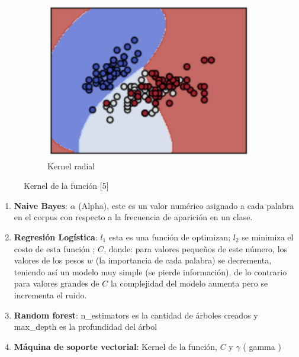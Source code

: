 \begin{enumerate}
\begin{itemize}
\begin{figure}[h]
        \begin{subfigure}{.25\textwidth}
        \centering
        \includegraphics[scale=0.4]{imagenes/Entrenamiento/krbf.png}
        \caption{Kernel radial}
        \label{fig:cp5:krbf}
        \end{subfigure}
      \caption{Kernel de la función [5]}
    \end{figure}

    \begin{enumerate}
      \item \textbf{Naive Bayes}: $\alpha$ (Alpha), este es un valor numérico asignado a cada palabra en el corpus con respecto a la frecuencia de aparición en un clase.\\

      \item \textbf{Regresión Logística}: $l_1$ esta es una función de optimizan; $l_2$ se minimiza el costo de esta función ; $C$, donde: para valores pequeños de este número, los valores de los pesos $w$ (la importancia de cada palabra) se decrementa, teniendo así un modelo muy simple (se pierde información), de lo contrario para valores grandes de $C$ la complejidad del modelo aumenta pero se incrementa el ruido.\\
      
      \item \textbf{Random forest}: n\_estimators es la cantidad de árboles creados y max\_depth es la profundidad del árbol\\
      \item \textbf{Máquina de soporte vectorial}: Kernel de la función, $C$ y $\gamma$ ( gamma )\\
    \end{enumerate} 



\end{itemize}
\end{enumerate}
